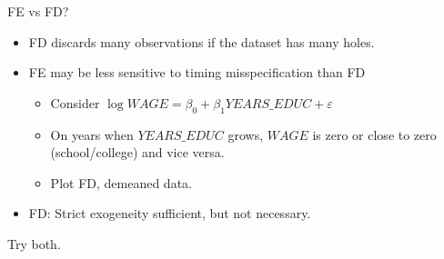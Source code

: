 \documentclass[notes=show,beamer,compress]{beamer}
\begin{document}

\begin{frame}{FE vs FD?}
	\begin{itemize}
		\item{FD discards many observations if the dataset has many holes.}
		\item{FE may be less sensitive to timing misspecification than FD
			\begin{itemize}
				\item{Consider $\log{WAGE} = \beta_0 + \beta_1YEARS\_EDUC + \varepsilon$ }
				\item{On years when $YEARS\_EDUC$ grows, $WAGE$ is zero or close to zero (school/college) and vice versa.}
				\item{Plot FD, demeaned data.}
			\end{itemize}}
		\item{FD: Strict exogeneity sufficient, but not necessary.}
	\end{itemize}
	Try both.
\end{frame}
\end{document}
